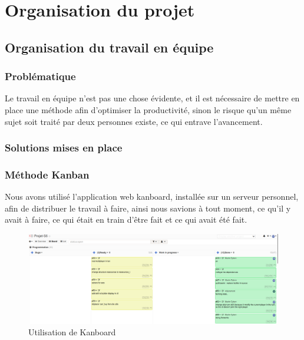 

\section{Organisation du projet}


\subsection{Organisation du travail en équipe}

\subsubsection*{Problématique}

Le travail en équipe n'est pas une chose évidente, et il est nécessaire de mettre en place une méthode afin d'optimiser la productivité, sinon le risque qu'un même sujet soit traité par deux personnes existe, ce qui entrave l'avancement.

\subsubsection*{Solutions mises en place}

\subsubsection*{Méthode Kanban}

Nous avons utilisé l'application web kanboard, installée sur un serveur personnel, afin de distribuer le travail à faire, ainsi nous savions à tout moment, ce qu'il y avait à faire, ce qui était en train d'être fait et ce qui avait été fait. 

\begin{figure}[H]
    \centering
    \includegraphics[width=\textwidth]{img/kanboard.png}
    \caption{Utilisation de Kanboard}
    \label{fig:kanboard}
\end{figure}



